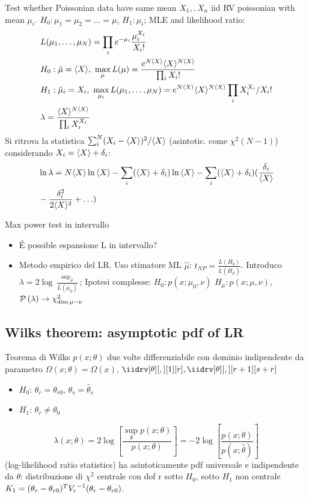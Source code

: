 \documentclass[asd-beamer.tex]{subfiles}%
\begin{document}
\begin{wordonframe}{Test whether Poissonian data have same mean}
$X_1,,X_n$ iid RV poissonian with mean $\mu_i$. $H_0: \mu_1=\mu_2=\ldots=\mu$, $H_1: \mu_i$; MLE and likelihood ratio:
\begin{align*}
&L(\mu_1,\ldots,\mu_N)=\prod_i\exp{-\mu_i}\frac{\mu_i^{X_i}}{X_i!}\\
&H_0: \hat{\mu}=\exv{X},\ \max_{\mu}L(\mu)=\frac{\exp{N\exv{X}}\exv{X}\expy{N\exv{X}}}{\prod_iX_i!}\\
&H_1: \hat{\mu}_i=X_i,\ \max_{\mu_i}L(\mu_1,\ldots,\mu_N)=\exp{N\exv{X}}\exv{X}\expy{N\exv{X}}\prod_iX_i\expy{X_i}/X_i!\\
&\lambda=\frac{\exv{X}\expy{N\exv{X}}}{\prod_iX_i\expy{X_i}}
\end{align*}
Si ritrova la statistica $\sum_i^N(X_i-\langle X \rangle)^2/\langle X \rangle$ (asintotic. come $\chi^2(N-1)$) considerando $X_i=\langle X \rangle+\delta_i$:
\begin{align*}
&\ln{\lambda}=N\langle X \rangle\ln{\langle X \rangle}-\sum_i(\langle X \rangle+\delta_i)\ln{\langle X \rangle}-\sum_i(\langle X \rangle+\delta_i)(\frac{\delta_i}{\langle X \rangle}\\
&-\frac{\delta_i^2}{2\langle X \rangle^2}+\ldots)
\end{align*}
\end{wordonframe}

\begin{wordonframe}{Max power test in intervallo}
\begin{itemize}
\item \'E possible espansione L in intervallo?
\item Metodo empirico del LR. Uso stimatore ML $\hat{\mu}$: $t_{NP}=\frac{L(H_0)}{L(H_{\mu})}$. Introduco $\lambda=2\log{\frac{\sup_{\mu}}{L(\mu_0)}}$; Ipotesi complesse: $H_0: p(x;\mu_0,\nu)$ $H_{\mu}: p(x;\mu,\nu)$, $\operatorname{\mathcal{P}}{(\lambda)}\to \chi^2_{\dim{\mu-\nu}}$
\end{itemize}
\end{wordonframe}

\subsection{Wilks theorem: asymptotic pdf of LR}

\begin{frame}{Teorema di Wilks}\frameintoc
	$p(x;\theta)$ due volte differenziabile con dominio indipendente da parametro $\Omega(x;\theta)=\Omega(x)$, $\iidrv[\theta][,][1][r],\iidrv[\theta][,][r+1][s+r]$
	\begin{itemize}
		\item $H_0$: $\theta_r=\theta_{r0}$, $\theta_s=\hat{\theta}_s$
		\item $H_1$: $\theta_r\neq\theta_0$
	\end{itemize}
    \[\lambda(x;\theta)=2\log{[\frac{\sup_{\theta}{p(x;\theta)}}{p(x;\theta)}]}=-2\log{[\frac{p(x;\theta)}{p(x;\hat{\theta})}]}\] (log-likelihood ratio statistics) ha asintoticamente pdf universale e indipendente da $\theta$: distribuzione di $\chi^2$ centrale con dof r sotto $H_0$, sotto $H_1$ non centrale $K_1=(\theta_r-\theta_{r0})^T{V_r}^{-1}(\theta_r-\theta_{r0})$.
\end{frame}
\end{document}
